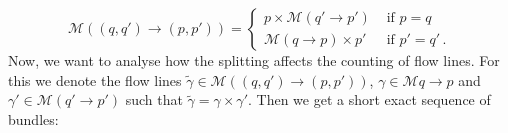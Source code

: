\begin{definition}
	\begin{equation*}
		\mathcal{M}\left((q,q')\to (p,p')\right)=\begin{cases}
			p\times \mathcal{M}(q' \to p')&\text{ if } p=q\\
			\mathcal{M}(q \to p)\times p' &\text{ if } p'=q' \,.
		\end{cases}
	\end{equation*}
	Now, we want to analyse how the splitting affects the counting of flow lines. For this we denote the flow lines $\tilde{\gamma}\in \mathcal{M}\left((q,q')\to (p,p')\right)$, $\gamma \in \mathcal{M}{q\to p}$ and $\gamma'\in \mathcal{M}(q'\to p')$ such that $\tilde{\gamma}=\gamma\times \gamma'$.
	Then we get a short exact sequence of bundles:

	\begin{center}
	\end{center}
	





\end{definition}
